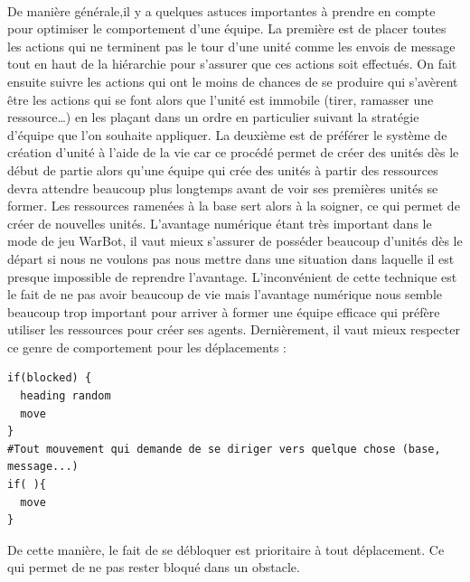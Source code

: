 \documentclass{report}
\begin{document}
\paragraph{}
De manière générale,il y a quelques astuces importantes à prendre en compte pour optimiser le comportement d’une équipe. La première est de placer toutes les actions qui ne terminent pas le tour d’une unité comme les envois de message tout en haut de la hiérarchie pour s’assurer que ces actions soit effectués. On fait ensuite suivre les actions qui ont le moins de chances de se produire qui s’avèrent être les actions qui se font alors que l’unité est immobile (tirer, ramasser une ressource…) en les plaçant dans un ordre en particulier suivant la stratégie d’équipe que l’on souhaite appliquer. \newline
La deuxième est de préférer le système de création d’unité à l’aide de la vie car ce procédé permet de créer des unités dès le début de partie alors qu’une équipe qui crée des unités à partir des ressources devra attendre beaucoup plus longtemps avant de voir ses premières unités se former. Les ressources ramenées à la base sert alors à la soigner, ce qui permet de créer de nouvelles unités. L’avantage numérique étant très important dans le mode de jeu WarBot, il vaut mieux s’assurer de posséder beaucoup d’unités dès le départ si nous ne voulons pas nous mettre dans une situation dans laquelle il est presque impossible de reprendre l’avantage. L’inconvénient de cette technique est le fait de ne pas avoir beaucoup de vie mais l’avantage numérique nous semble beaucoup trop important pour arriver à former une équipe efficace qui préfère utiliser les ressources pour créer ses agents. \newline
Dernièrement, il vaut mieux respecter ce genre de comportement pour les déplacements :
\begin{lstlisting}[frame=single]
if(blocked) {
  heading random
  move
}
#Tout mouvement qui demande de se diriger vers quelque chose (base, message...)
if( ){
  move
}
\end{lstlisting}
De cette manière, le fait de se débloquer est prioritaire à tout déplacement. Ce qui permet de ne pas rester bloqué dans un obstacle.
\end{document}
